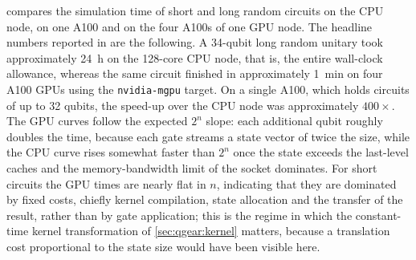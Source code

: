  compares the simulation time of short and long random circuits on the CPU node, on one A100 and on the four A100s of one GPU node. The headline numbers reported in \cite{guo2025qgear} are the following. A 34-qubit long random unitary took approximately \SI{24}{\hour} on the 128-core CPU node, that is, the entire wall-clock allowance, whereas the same circuit finished in approximately \SI{1}{\minute} on four A100 GPUs using the \texttt{nvidia-mgpu} target. On a single A100, which holds circuits of up to 32 qubits, the speed-up over the CPU node was approximately $400\times$. The GPU curves follow the expected $2^{n}$ slope: each additional qubit roughly doubles the time, because each gate streams a state vector of twice the size, while the CPU curve rises somewhat faster than $2^{n}$ once the state exceeds the last-level caches and the memory-bandwidth limit of the socket dominates. For short circuits the GPU times are nearly flat in $n$, indicating that they are dominated by fixed costs, chiefly kernel compilation, state allocation and the transfer of the result, rather than by gate application; this is the regime in which the constant-time kernel transformation of \cref{sec:qgear:kernel} matters, because a translation cost proportional to the state size would have been visible here.

